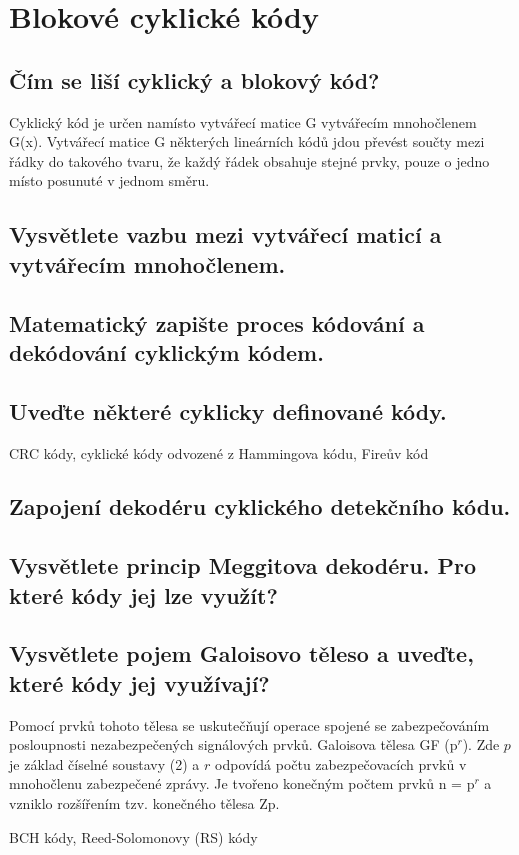 \clearpage
\section{Blokové cyklické kódy}
\subsection{Čím se liší cyklický a blokový kód?}
Cyklický kód je určen namísto vytvářecí matice G vytvářecím mnohočlenem G(x).
Vytvářecí matice G některých lineárních kódů jdou převést součty mezi řádky do takového tvaru, že každý řádek obsahuje stejné prvky, pouze o jedno místo posunuté v jednom směru.

\subsection{Vysvětlete vazbu mezi vytvářecí maticí a vytvářecím mnohočlenem.}

\subsection{Matematický zapište proces kódování a dekódování cyklickým kódem.}

\subsection{Uveďte některé cyklicky definované kódy.}
CRC kódy, cyklické kódy odvozené z Hammingova kódu, Fireův kód 

\subsection{Zapojení dekodéru cyklického detekčního kódu.}

\subsection{Vysvětlete princip Meggitova dekodéru. Pro které kódy jej lze využít?}

\subsection{Vysvětlete pojem Galoisovo těleso a uveďte, které kódy jej využívají?}
Pomocí prvků tohoto tělesa se uskutečňují operace spojené se zabezpečováním posloupnosti nezabezpečených signálových prvků. Galoisova tělesa GF (p$^r$). Zde $p$ je základ číselné soustavy (2) a $r$ odpovídá počtu zabezpečovacích prvků v mnohočlenu zabezpečené zprávy. Je tvořeno konečným počtem prvků n = p$^r$  a vzniklo rozšířením tzv. konečného tělesa Zp.

BCH kódy, Reed-Solomonovy (RS) kódy
